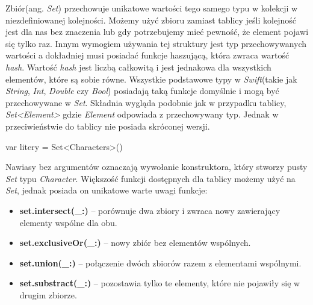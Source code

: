 \documentclass{iiuwb}
\begin{document}
Zbiór(ang. \textit{Set}) przechowuje unikatowe wartości tego samego typu w kolekcji w niezdefiniowanej kolejności. Możemy użyć zbioru zamiast tablicy jeśli kolejność jest dla nas bez znaczenia lub gdy potrzebujemy mieć pewność, że element pojawi się tylko raz. Innym wymogiem używania tej struktury jest typ przechowywanych wartości a dokładniej musi posiadać funkcje haszującą, która zwraca wartość \textit{hash}. Wartość \textit{hash} jest liczbą całkowitą i jest jednakowa dla wszystkich elementów, które są sobie równe. Wszystkie podstawowe typy w \textit{Swift}(takie jak \textit{String},  \textit{Int},  \textit{Double} czy \textit{Bool}) posiadają taką funkcje domyślnie i mogą być przechowywane w \textit{Set}. Składnia wygląda podobnie jak w przypadku tablicy, \textit{Set<Element>} gdzie \textit{Element} odpowiada z przechowywany typ. Jednak w przeciwieństwie do tablicy nie posiada skróconej wersji. 
\begin{center}
	var litery = Set<Characters>()
\end{center}
Nawiasy bez argumentów oznaczają wywołanie konstruktora, który stworzy pusty \textit{Set} typu \textit{Character}. Większość funkcji dostępnych dla tablicy możemy użyć na \textit{Set}, jednak posiada on unikatowe warte uwagi funkcje:
\begin{itemize}
\item \textbf{set.intersect(\_:)} -- porównuje dwa zbiory i zwraca nowy zawierający elementy wspólne dla obu.
\item \textbf{set.exclusiveOr(\_:)} -- nowy zbiór bez elementów wspólnych.
\item \textbf{set.union(\_:)} -- połączenie dwóch zbiorów razem z elementami wspólnymi.
\item \textbf{set.substract(\_:)} -- pozostawia tylko te elementy, które nie pojawiły się w drugim zbiorze.
\end{itemize}
\end{document}
